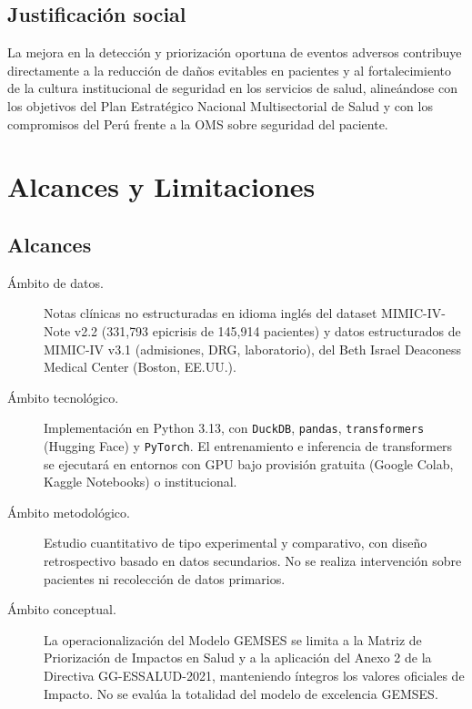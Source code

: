 \subsection{Justificación social}
La mejora en la detección y priorización oportuna de eventos adversos contribuye directamente a la reducción de daños evitables en pacientes y al fortalecimiento de la cultura institucional de seguridad en los servicios de salud, alineándose con los objetivos del Plan Estratégico Nacional Multisectorial de Salud y con los compromisos del Perú frente a la OMS sobre seguridad del paciente.

\section{Alcances y Limitaciones}

\subsection*{Alcances}
\begin{description}
    \item[Ámbito de datos.] Notas clínicas no estructuradas en idioma inglés del dataset MIMIC-IV-Note v2.2 (331{,}793 epicrisis de 145{,}914 pacientes) y datos estructurados de MIMIC-IV v3.1 (admisiones, DRG, laboratorio), del Beth Israel Deaconess Medical Center (Boston, EE.UU.).
    \item[Ámbito tecnológico.] Implementación en Python 3.13, con \texttt{DuckDB}, \texttt{pandas}, \texttt{transformers} (Hugging Face) y \texttt{PyTorch}. El entrenamiento e inferencia de transformers se ejecutará en entornos con GPU bajo provisión gratuita (Google Colab, Kaggle Notebooks) o institucional.
    \item[Ámbito metodológico.] Estudio cuantitativo de tipo experimental y comparativo, con diseño retrospectivo basado en datos secundarios. No se realiza intervención sobre pacientes ni recolección de datos primarios.
    \item[Ámbito conceptual.] La operacionalización del Modelo GEMSES se limita a la Matriz de Priorización de Impactos en Salud y a la aplicación del Anexo 2 de la Directiva GG-ESSALUD-2021, manteniendo íntegros los valores oficiales de Impacto. No se evalúa la totalidad del modelo de excelencia GEMSES.
\end{description}


